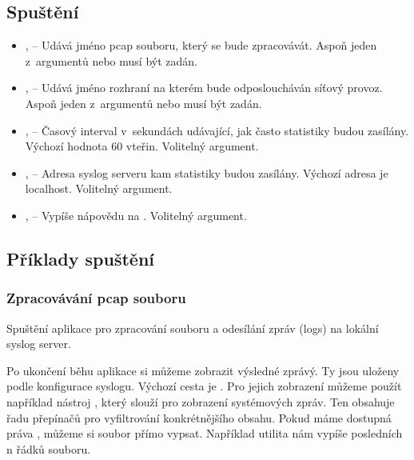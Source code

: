 \documentclass[11pt, a4paper, titlepage]{article}
\begin{document}
\subsection{Spuštění}


\begin{itemize}
	\item {},  -- Udává jméno pcap souboru, který se bude zpracovávát. Aspoň jeden z~argumentů  nebo  musí být zadán.

	\item {},  -- Udává jméno rozhraní na kterém bude odposloucháván síťový provoz. Aspoň jeden z~argumentů  nebo  musí být zadán.

	\item {},  -- Časový interval v~sekundách udávající, jak často statistiky budou zasílány. Výchozí hodnota 60 vteřin. Volitelný argument.

	\item {},  -- Adresa syslog serveru kam statistiky budou zasílány. Výchozí adresa je localhost. Volitelný argument.

	\item {},  -- Vypíše nápovědu na . Volitelný argument.
\end{itemize}
\smallskip



\subsection{Příklady spuštění}

\subsubsection{Zpracovávání pcap souboru}

Spuštění aplikace pro zpracování  souboru a odesílání zpráv (logs) na lokální syslog server.

\begin{center}
\end{center}

Po ukončení běhu aplikace si můžeme zobrazit výsledné zprávý. Ty jsou uloženy podle konfigurace syslogu. Výchozí cesta je . Pro jejich zobrazení můžeme použít například nástroj , který slouží pro zobrazení systémových zpráv. Ten obsahuje řadu přepínačů pro vyfiltrování konkrétnějšího obsahu. Pokud máme dostupná práva , můžeme si soubor přímo vypsat. Například utilita  nám vypíše posledních n řádků souboru.
\end{document}
